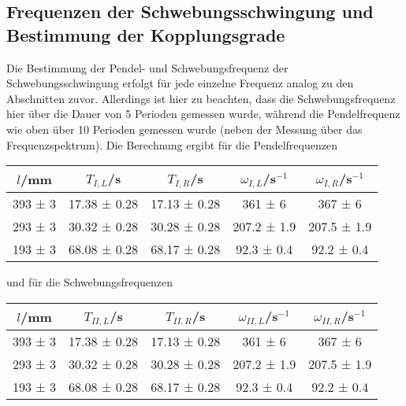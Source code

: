 \documentclass[12pt,a4paper,german]{scrartcl}
\numberwithin{equation}{section}
\begin{document}
  \subsection{Frequenzen der Schwebungsschwingung und Bestimmung der Kopplungsgrade}
  \label{sec_beats}
  Die Bestimmung der Pendel- und Schwebungsfrequenz der Schwebungsschwingung erfolgt für jede einzelne Frequenz analog zu den Abschnitten zuvor.
  Allerdings ist hier zu beachten, dass die Schwebungsfrequenz hier über die Dauer von 5 Perioden gemessen wurde, während die Pendelfrequenz wie oben über 10 Perioden gemessen wurde (neben der Messung über das Frequenzspektrum).
  Die Berechnung ergibt für die Pendelfrequenzen

  \begin{center}
    \begin{tabular}{c|c|c|c|c}
      $l$/mm & $T_{I,L}$/s & $T_{I,R}$/s & $\omega_{I,L}$/s$^{-1}$ & $\omega_{I,R}$/s$^{-1}$ \\
      \hline
      393 ± 3 & 17.38 ± 0.28 & 17.13 ± 0.28 &   361 ± 6   &   367 ± 6   \\
      293 ± 3 & 30.32 ± 0.28 & 30.28 ± 0.28 & 207.2 ± 1.9 & 207.5 ± 1.9 \\
      193 ± 3 & 68.08 ± 0.28 & 68.17 ± 0.28 &  92.3 ± 0.4 &  92.2 ± 0.4
    \end{tabular}
    \label{table_beats_T_omega_left_right}
  \end{center}

  und für die Schwebungsfrequenzen

  \begin{center}
    \begin{tabular}{c|c|c|c|c}
      $l$/mm & $T_{II,L}$/s & $T_{II,R}$/s & $\omega_{II,L}$/s$^{-1}$ & $\omega_{II,R}$/s$^{-1}$ \\
      \hline
      393 ± 3 & 17.38 ± 0.28 & 17.13 ± 0.28 &   361 ± 6   &   367 ± 6   \\
      293 ± 3 & 30.32 ± 0.28 & 30.28 ± 0.28 & 207.2 ± 1.9 & 207.5 ± 1.9 \\
      193 ± 3 & 68.08 ± 0.28 & 68.17 ± 0.28 &  92.3 ± 0.4 &  92.2 ± 0.4
    \end{tabular}
    \label{table_beats_T_omega_beat_left_right}
  \end{center}
\end{document}
